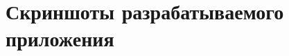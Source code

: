 \newpage
\appendix
{}
\chapter{Скриншоты разрабатываемого приложения}\label{ap:screenshot}

% 
% 
% 
% 
